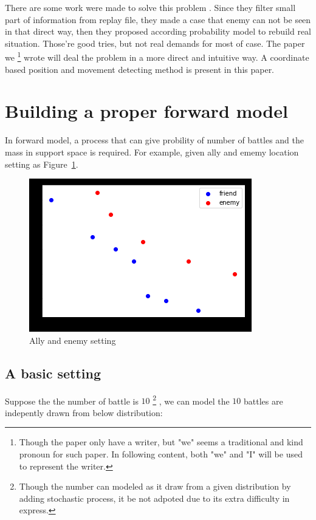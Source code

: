 \documentclass{article}
\begin{document}
There are some work were made to solve this problem 
\cite{hostetler2012inferring} \cite{vsmejkal2016integrating} \cite{touhou}.
Since they filter small part of information from replay file, they made a case that enemy can not be 
seen in that direct way, then they proposed according probability model to rebuild real situation.
Those're good tries, but not real demands for most of case. The paper we
\footnote{Though the paper only have a writer, 
but "we" seems a traditional and kind pronoun for such paper. 
In following content, both "we" and "I" will be used to represent the writer.} 
wrote will deal the problem in a more direct and intuitive way. 
A coordinate based position and movement detecting method is present in this paper.

\section{Building a proper forward model}


In forward model, a process that can give probility of number of battles and the mass in support space 
is required. For example, given ally and ememy location setting as Figure~\ref{fig:stateNoBattle}.

\begin{figure}[h]
\includegraphics{state_no_battle.png}
\caption{Ally and enemy setting}
\label{fig:stateNoBattle}
\end{figure}

\subsection{A basic setting}

Suppose the the number of battle is $10$ 
\footnote{ Though the number can modeled as it draw from a given distribution by adding 
stochastic process, it be not adpoted due to its extra difficulty in express.}
, we can model the $10$ battles are indepently drawn from below distribution:
\end{document}
